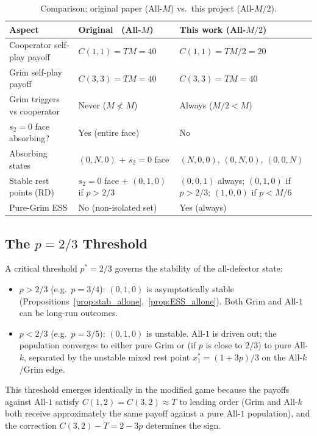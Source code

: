 \documentclass[12pt,a4paper]{article}
\begin{document}
\begin{table}[H]
\centering
\caption{Comparison: original paper (All-$M$) vs.\ this project (All-$M/2$).}
\label{tab:differences}
\small
\begin{tabular}{lll}
\toprule
Aspect & Original~\cite{LK2026} (All-$M$) & This work (All-$M/2$) \\
\midrule
Cooperator self-play payoff & $C(1,1)=TM=40$ & $C(1,1)=TM/2=20$ \\
Grim self-play payoff & $C(3,3)=TM=40$ & $C(3,3)=TM=40$ \\
Grim triggers vs cooperator & Never ($M\not<M$) & Always ($M/2<M$) \\
$s_2=0$ face absorbing? & Yes (entire face) & No \\
Absorbing states & $(0,N,0)$ + $s_2=0$ face & $(N,0,0)$, $(0,N,0)$, $(0,0,N)$ \\
Stable rest points (RD) & $s_2=0$ face + $(0,1,0)$ if $p>2/3$ & $(0,0,1)$ always; $(0,1,0)$ if $p>2/3$; $(1,0,0)$ if $p<M/6$ \\
Pure-Grim ESS & No (non-isolated set) & Yes (always) \\
\bottomrule
\end{tabular}
\end{table}

\subsection{The \texorpdfstring{$p = 2/3$}{p = 2/3} Threshold}

A critical threshold $p^*=2/3$ governs the stability of the all-defector state:
\begin{itemize}
  \item $p>2/3$ (e.g.\ $p=3/4$): $(0,1,0)$ is asymptotically stable
        (Propositions~\ref{prop:stab_allone},~\ref{prop:ESS_allone}).
        Both Grim and All-$1$ can be long-run outcomes.
  \item $p<2/3$ (e.g.\ $p=3/5$): $(0,1,0)$ is unstable. All-$1$ is driven out;
        the population converges to either pure Grim or (if $p$ is close
        to $2/3$) to pure All-$k$, separated by the unstable mixed rest point
        $x_1^*=(1+3p)/3$ on the All-$k$/Grim edge.
\end{itemize}
This threshold emerges identically in the modified game because the
payoffs against All-$1$ satisfy $C(1,2)=C(3,2)\approx T$ to leading order
(Grim and All-$k$ both receive approximately the same payoff against a pure
All-$1$ population), and the correction $C(3,2)-T=2-3p$ determines the sign.
\end{document}
